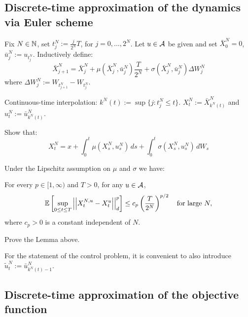 \subsection{Discrete-time approximation of the dynamics via Euler scheme}

\begin{remark}
    Fix $N \in \mathbb N$, set $t_j^N := \frac{j}{2^N} T$, for $j = 0, \dots, 2^N$.
    Let $u \in \mathcal{A}$ be given and set $\bar{X}_0^N = 0$, $\bar{u}_j^N := u_{t_j^N}$.
    Inductively define:
    \[ \bar{X}_{j+1}^N = \bar{X}_j^N + \mu(\bar{X}_j^N, \bar{u}_j^N) \frac{T}{2^N} + \sigma(\bar{X}_j^N, \bar{u}_j^N) \Delta W_j^N \]
    where $\Delta W_j^N := W_{t_{j+1}^N} - W_{t_j^N}$.
    
    Continuous-time interpolation: $k^N(t) := \sup \{ j : t_j^N \leq t \}$.
    $X_t^N := \bar{X}_{k^N(t)}^N$ and $u_t^N := \bar{u}_{k^N(t)}^N$.
\end{remark}

\begin{homework}
    Show that:
    \[ X_t^N = x + \int_0^t \mu(X_s^N, u_s^N) \, ds + \int_0^t \sigma(X_s^N, u_s^N) \, dW_s \]
\end{homework}

\begin{remark}
    Under the Lipschitz assumption on $\mu$ and $\sigma$ we have:
\end{remark}

\begin{lemma}
    For every $p \in [1, \infty)$ and $T > 0$, for any $u \in \mathcal{A}$,
    \[ \mathbb E \left[ \sup_{0 \leq t \leq T} \left|\left|X_t^{N,u} - X_t^u\right|\right|_d^p \right] \leq c_p \left(\frac{T}{2^N}\right)^{p/2} \quad \text{for large } N, \]
    where $c_p > 0$ is a constant independent of $N$.
\end{lemma}

\begin{homework}[Advanced]
    Prove the Lemma above.
\end{homework}

\begin{remark}
    For the statement of the control problem, it is convenient to also introduce $\tilde{u}_t^N := \bar{u}_{k^N(t)-1}^N$.
\end{remark}

\subsection{Discrete-time approximation of the objective function}

